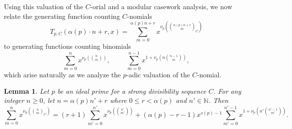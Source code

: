 \documentclass{amsart}
\newtheorem{lemma}[theorem]{Lemma}
\theoremstyle{definition}
\newcommand{\N}{\mathbb{N}}
\begin{document}
Using this valuation of the $C$-orial and a modular casework analysis, we now relate the generating function counting $C$-nomials
\[
T_{p,C}(\alpha(p)\cdot n + r, x) = \sum_{m=0}^{\alpha(p)n + r} x^{\nu_p\!\left( \binom{\alpha(p)n + r}{m}_C \right)}
\]
to generating functions counting binomials
$$\sum_{m=0}^{n} x^{\nu_p\!\left(\binom{n}{m}\right)}, \hspace{1cm} \sum_{m=0}^{n-1} x^{1+\nu_p\!\left(n\binom{n-1}{m}\right)},$$ 
which arise naturally as we analyze the $p$-adic valuation of the $C$-nomial. 

\begin{lemma}
\label{lemma:idealCnomialSummationInBinomials}
Let $p$ be an ideal prime for a strong divisibility sequence $C$. For any integer $n\geq0$, let $n=\alpha(p)n'+r$ where $0 \leq r <\alpha(p)$ and $ n' \in \N $. Then
$$\sum_{m=0}^{n} x^{\nu_p\!\left( \binom{n}{m}_C \right)} = (r+1)\sum_{m'=0}^{n'} x^{\nu_p\!\left(\binom{n'}{m'}\right)} + (\alpha(p) - r - 1)x^{s(p) - 1}\sum_{m'=0}^{n'-1} x^{1+\nu_p\!\left(n'\binom{n'-1}{m'}\right)}.$$
\end{lemma}
\end{document}
